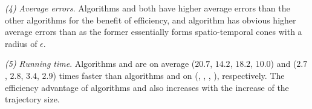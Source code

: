 \sstab\emph{(4) Average errors}. {Algorithms \cist and \cista both have higher average errors than the other algorithms for the benefit of efficiency, and algorithm \cista has obvious higher average errors than \cist as the former essentially forms spatio-temporal cones with a radius of $\epsilon$.}

\sstab\emph{(5) Running time}. Algorithms \cist and \cista are on average ($20.7$, $14.2$, $18.2$, $10.0$) and ($2.7$, $2.8$, $3.4$, {$2.9$}) times faster than algorithms \dps and \squishe on (\truck, \sercar, {\geolife}, \pricar), respectively. The efficiency advantage of algorithms \cist and \cista also increases  with the increase of the trajectory size.







